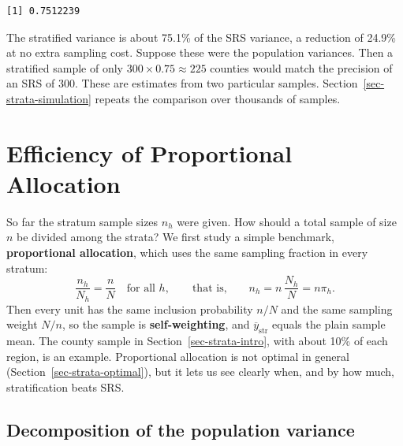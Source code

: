 \documentclass[
  letterpaper,
  DIV=11,
  numbers=noendperiod]{scrreprt}
\newenvironment{Shaded}{\begin{snugshade}}{\end{snugshade}}
\newcommand{\DecValTok}[1]{\textcolor[rgb]{0.68,0.00,0.00}{#1}}
\newcommand{\DocumentationTok}[1]{\textcolor[rgb]{0.37,0.37,0.37}{\textit{#1}}}
\newcommand{\FunctionTok}[1]{\textcolor[rgb]{0.28,0.35,0.67}{#1}}
\newcommand{\NormalTok}[1]{\textcolor[rgb]{0.00,0.23,0.31}{#1}}
\newcommand{\OtherTok}[1]{\textcolor[rgb]{0.00,0.23,0.31}{#1}}
\newcommand{\SpecialCharTok}[1]{\textcolor[rgb]{0.37,0.37,0.37}{#1}}
\newcommand{\StringTok}[1]{\textcolor[rgb]{0.13,0.47,0.30}{#1}}
\renewcommand{\[}{\begin{equation}}
\renewcommand{\]}{\end{equation}}
\begin{document}
\begin{Shaded}
\end{Shaded}

\begin{verbatim}
[1] 0.7512239
\end{verbatim}

The stratified variance is about 75.1\% of the SRS variance, a reduction
of 24.9\% at no extra sampling cost. Suppose these were the population
variances. Then a stratified sample of only
\(300 \times 0.75 \approx 225\) counties would match the precision of an
SRS of 300. These are estimates from two particular samples.
Section~\ref{sec-strata-simulation} repeats the comparison over
thousands of samples.

\section{Efficiency of Proportional Allocation}\label{sec-strata-prop}

So far the stratum sample sizes \(n_h\) were given. How should a total
sample of size \(n\) be divided among the strata? We first study a
simple benchmark, \textbf{proportional allocation}, which uses the same
sampling fraction in every stratum: \[
\frac{n_h}{N_h} = \frac nN \quad \text{for all } h, \qquad\text{that is,}\qquad n_h = n\,\frac{N_h}{N} = n\pi_h .
\] Then every unit has the same inclusion probability \(n/N\) and the
same sampling weight \(N/n\), so the sample is \textbf{self-weighting},
and \(\overline y_{\text{str}}\) equals the plain sample mean. The
county sample in Section~\ref{sec-strata-intro}, with about 10\% of each
region, is an example. Proportional allocation is not optimal in general
(Section~\ref{sec-strata-optimal}), but it lets us see clearly when, and
by how much, stratification beats SRS.

\subsection{Decomposition of the population
variance}\label{decomposition-of-the-population-variance}
\end{document}
